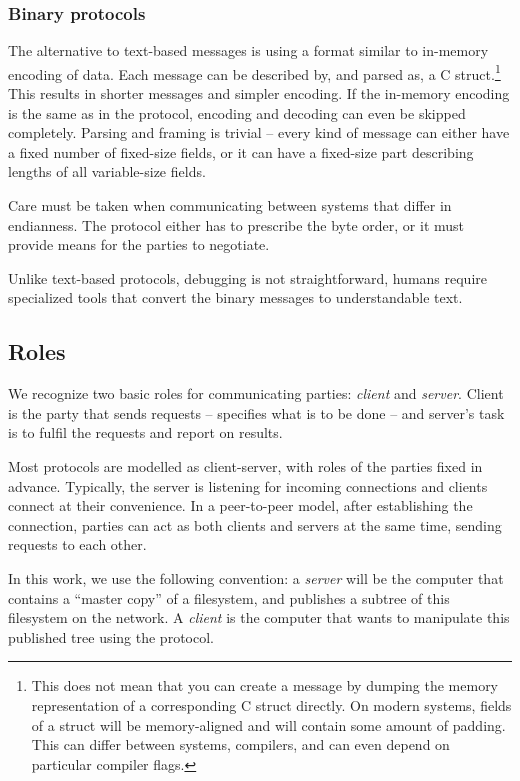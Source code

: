 \subsubsection{Binary protocols}

The alternative to text-based messages is using a format similar to in-memory encoding of data. Each message
can be described by, and parsed as, a C struct.\footnote{This does not mean that you can create a message by
dumping the memory representation of a corresponding C struct directly. On modern systems, fields of a struct
will be memory-aligned and will contain some amount of padding. This can differ between systems, compilers,
and can even depend on particular compiler flags.} This results in shorter messages and simpler encoding. If
the in-memory encoding is the same as in the protocol, encoding and decoding can even be skipped completely.
Parsing and framing is trivial -- every kind of message can either have a fixed number of fixed-size fields, or
it can have a fixed-size part describing lengths of all variable-size fields.

Care must be taken when communicating between systems that differ in endianness.  The protocol either has to
prescribe the byte order, or it must provide means for the parties to negotiate.

Unlike text-based protocols, debugging is not straightforward, humans require specialized tools that convert
the binary messages to understandable text.


\subsection{Roles}

We recognize two basic roles for communicating parties: {\it client} and {\it server}. Client is the party
that sends requests -- specifies what is to be done -- and server's task is to fulfil the requests and report on
results.

Most protocols are modelled as client-server, with roles of the parties fixed in advance. Typically, the
server is listening for incoming connections and clients connect at their convenience. In a peer-to-peer
model, after establishing the connection, parties can act as both clients and servers at the same time,
sending requests to each other.

In this work, we use the following convention: a {\it server} will be the computer that contains a ``master
copy'' of a filesystem, and publishes a subtree of this filesystem on the network. A {\it client} is the
computer that wants to manipulate this published tree using the protocol.


